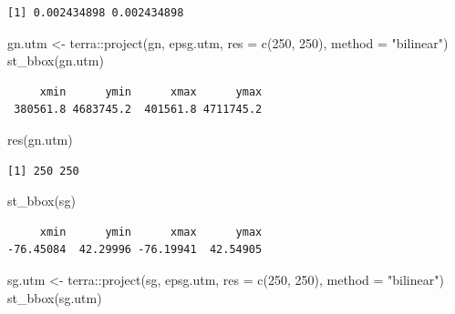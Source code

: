 \documentclass[
  letterpaper,
  DIV=11,
  numbers=noendperiod]{scrartcl}
\newenvironment{Shaded}{\begin{snugshade}}{\end{snugshade}}
\newcommand{\AttributeTok}[1]{\textcolor[rgb]{0.40,0.45,0.13}{#1}}
\newcommand{\DecValTok}[1]{\textcolor[rgb]{0.68,0.00,0.00}{#1}}
\newcommand{\FunctionTok}[1]{\textcolor[rgb]{0.28,0.35,0.67}{#1}}
\newcommand{\NormalTok}[1]{\textcolor[rgb]{0.00,0.23,0.31}{#1}}
\newcommand{\OtherTok}[1]{\textcolor[rgb]{0.00,0.23,0.31}{#1}}
\newcommand{\SpecialCharTok}[1]{\textcolor[rgb]{0.37,0.37,0.37}{#1}}
\newcommand{\StringTok}[1]{\textcolor[rgb]{0.13,0.47,0.30}{#1}}
\begin{document}
\begin{verbatim}
[1] 0.002434898 0.002434898
\end{verbatim}

\begin{Shaded}
\begin{Highlighting}[]
\NormalTok{gn.utm }\OtherTok{\textless{}{-}}\NormalTok{ terra}\SpecialCharTok{::}\FunctionTok{project}\NormalTok{(gn, epsg.utm, }
                         \AttributeTok{res =} \FunctionTok{c}\NormalTok{(}\DecValTok{250}\NormalTok{, }\DecValTok{250}\NormalTok{), }\AttributeTok{method =} \StringTok{"bilinear"}\NormalTok{)}
\FunctionTok{st\_bbox}\NormalTok{(gn.utm)}
\end{Highlighting}
\end{Shaded}

\begin{verbatim}
     xmin      ymin      xmax      ymax 
 380561.8 4683745.2  401561.8 4711745.2 
\end{verbatim}

\begin{Shaded}
\begin{Highlighting}[]
\FunctionTok{res}\NormalTok{(gn.utm)}
\end{Highlighting}
\end{Shaded}

\begin{verbatim}
[1] 250 250
\end{verbatim}

\begin{Shaded}
\begin{Highlighting}[]
\FunctionTok{st\_bbox}\NormalTok{(sg)}
\end{Highlighting}
\end{Shaded}

\begin{verbatim}
     xmin      ymin      xmax      ymax 
-76.45084  42.29996 -76.19941  42.54905 
\end{verbatim}

\begin{Shaded}
\begin{Highlighting}[]
\NormalTok{sg.utm }\OtherTok{\textless{}{-}}\NormalTok{ terra}\SpecialCharTok{::}\FunctionTok{project}\NormalTok{(sg, epsg.utm, }
                         \AttributeTok{res =} \FunctionTok{c}\NormalTok{(}\DecValTok{250}\NormalTok{, }\DecValTok{250}\NormalTok{), }\AttributeTok{method =} \StringTok{"bilinear"}\NormalTok{)}
\FunctionTok{st\_bbox}\NormalTok{(sg.utm)}
\end{Highlighting}
\end{Shaded}
\end{document}
